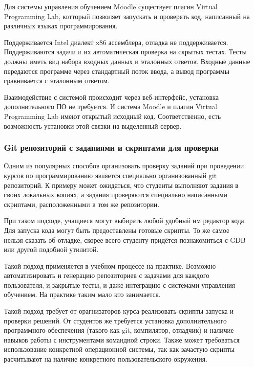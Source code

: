 \documentclass[a4paper,article,14pt]{extarticle}
\begin{document}
Для системы управления обучением Moodle\cite{moodle} существует плагин Virtual Programming Lab\cite{vpl}, котторый позволяет запускать и проверять код, написанный на различных языках программирования.

Поддерживается Intel диалект x86 ассемблера, отладка не поддерживается. Поддерживаются задачи и их автоматическая проверка на скрытых тестах. Тесты должны иметь вид набора входных данных и эталонных ответов. Входные данные передаются программе через стандартный поток ввода, а вывод программы сравнивается с эталонным ответом.

Взаимодействие с системой происходит через веб-интерфейс, установка дополнительного ПО не требуется. И система Moodle и плагин Virtual Programming Lab имеют открытый исходный код. Соответственно, есть возможность установки этой связки на выделенный сервер.

\subsubsection{Git репозиторий с заданиями и скриптами для проверки}

Одним из популярных способов организовать проверку заданий при проведении курсов по программированию является специально организованный git репозиторий. К примеру может ожидаться, что студенты выполняют задания в своих локальных копиях, а задания проверяются специально написанными скриптами, расположенными в том же репозитории.

При таком подходе, учащиеся могут выбирать любой удобный им редактор кода. Для запуска кода могут быть предоставлены готовые скрипты. То же самое нельзя сказать об отладке, скорее всего студенту придётся познакомиться с GDB или другой подобной утилитой.

Такой подход применяется в учебном процессе на практике. Возможно автоматизировать и генерацию репозиториев с задачами для каждого пользователя, и закрытые тесты, и даже интеграцию с системами управления обучением. На практике таким мало кто занимается.

Такой подход требует от орагнизаторов курса реализовать скрипты запуска и проверки решений. От студентов же требуется установка дополнительного программного обеспечения (такого как git, компилятор, отладчик) и наличие навыков работы с инструментами командной строки. Также может требоваться использование конкретной операционной системы, так как зачастую скрипты расчитывают на наличие конкретного пользовательского окружения.
\end{document}
